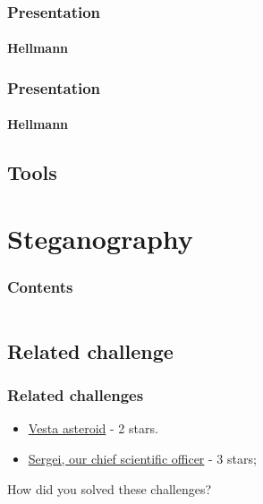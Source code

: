 \documentclass[]{beamer}
\begin{document}
\begin{frame}
\frametitle{Presentation}
\framesubtitle{Hellmann}


\end{frame}


\begin{frame}
\frametitle{Presentation}
\framesubtitle{Hellmann}


\end{frame}






\subsection{Tools}



%
%
\section{Steganography}
\begin{frame}
    \frametitle{Contents}
    \begin{columns}[t]
        \begin{column}{5cm}
            \tableofcontents[sections={1-3}, currentsection, hideothersubsections]
        \end{column}
        \begin{column}{5cm}
            \tableofcontents[sections={4-5}, currentsection, hideothersubsections]
        \end{column}
    \end{columns}
\end{frame}
\subsection{Related challenge}
\begin{frame}
\frametitle{Related challenges}
\begin{itemize}
    \item \href{https://github.com/cscluxembourg/vestatech/blob/master/challenges/Vesta-asteroid/vesta.png}{Vesta asteroid} - 2 stars.
    \item \href{https://github.com/cscluxembourg/vestatech/blob/master/challenges/sergei/Sergei.png}{Sergei, our chief scientific officer} - 3 stars;
\end{itemize}
\bigskip
How did you solved these challenges?
\end{frame}
\end{document}
